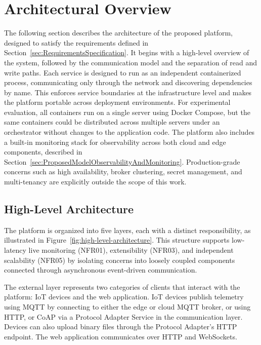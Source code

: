 
\section{Architectural Overview}
\label{sec:ProposedModelArchitecturalOverview}

The following section describes the architecture of the proposed platform, designed to satisfy the requirements defined in Section~\ref{sec:RequirementsSpecification}. It begins with a high-level overview of the system, followed by the communication model and the separation of read and write paths. Each service is designed to run as an independent containerized process, communicating only through the network and discovering dependencies by name. This enforces service boundaries at the infrastructure level and makes the platform portable across deployment environments. For experimental evaluation, all containers run on a single server using Docker Compose, but the same containers could be distributed across multiple servers under an orchestrator without changes to the application code. The platform also includes a built-in monitoring stack for observability across both cloud and edge components, described in Section~\ref{sec:ProposedModelObservabilityAndMonitoring}. Production-grade concerns such as high availability, broker clustering, secret management, and multi-tenancy are explicitly outside the scope of this work.

\subsection{High-Level Architecture}
The platform is organized into five layers, each with a distinct responsibility, as illustrated in Figure~\ref{fig:high-level-architecture}. This structure supports low-latency live monitoring (NFR01), extensibility (NFR03), and independent scalability (NFR05) by isolating concerns into loosely coupled components connected through asynchronous event-driven communication.

The external layer represents two categories of clients that interact with the platform: \gls{IoT} devices and the web application. \gls{IoT} devices publish telemetry using \gls{MQTT} by connecting to either the edge or cloud \gls{MQTT} broker, or using \gls{HTTP}, or \gls{CoAP} via a Protocol Adapter Service in the communication layer. Devices can also upload binary files through the Protocol Adapter's \gls{HTTP} endpoint. The web application communicates over \gls{HTTP} and WebSockets.

